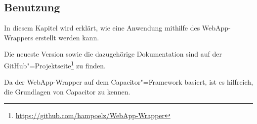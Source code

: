 \subsection{Benutzung}
\label{sec:WebApp-Wrapper:Benutzung}

In diesem Kapitel wird erklärt, wie eine Anwendung mithilfe des WebApp-Wrappers erstellt werden kann.

Die neueste Version sowie die dazugehörige Dokumentation sind auf der GitHub"=Projektseite\footnote{\url{https://github.com/hampoelz/WebApp-Wrapper}} zu finden.

Da der WebApp-Wrapper auf dem Capacitor"=Framework basiert, ist es hilfreich, die Grundlagen von Capacitor zu kennen.


\clearpage


\clearpage


\clearpage


\clearpage


